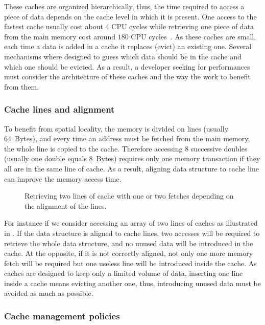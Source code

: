 These caches are organized hierarchically, thus, the time required to access a piece of data depends on the cache level in which it is present.
One access to the fastest cache usually cost about $4$ \gls{CPU} cycles while retrieving one piece of data from the main memory cost around $180$ \gls{CPU} cycles~\cite{Levinthal09Performance}.
As these caches are small, each time a data is added in a cache it replaces (evict) an existing one.
Several mechanisms where designed to guess which data should be in the cache and which one should be evicted.
As a result, a developer seeking for performances must consider the architecture of these caches and the way the work to benefit from them.

\subsubsection{Cache lines and alignment}

To benefit from spatial locality, the memory is divided on lines (usually \SI{64}{Bytes}), and every time an address must be fetched from the main memory, the whole line is copied to the cache.
Therefore accessing $8$ successive doubles (usually one double equals \SI{8}{Bytes}) requires only one memory transaction if they all are in the same line of cache.
As a result, aligning data structure to cache line can improve the memory access time.

\begin{figure}[htb]
    \centering
    
    \caption[Example of bad alignment.]{Retrieving two lines of cache with one or two fetches depending on the alignment of the lines.}
    \label{fig:bad-align}
\end{figure}

For instance if we consider accessing an array of two lines of caches as illustrated in .
If the data structure is aligned to cache lines, two accesses will be required to retrieve the whole data structure, and no unused data will be introduced in the cache.
At the opposite, if it is not correctly aligned, not only one more memory fetch will be required but one useless line will be introduced inside the cache.
As caches are designed to keep only a limited volume of data, inserting one line inside a cache means evicting another one, thus, introducing unused data must be avoided as much as possible.

\subsubsection{Cache management policies}

